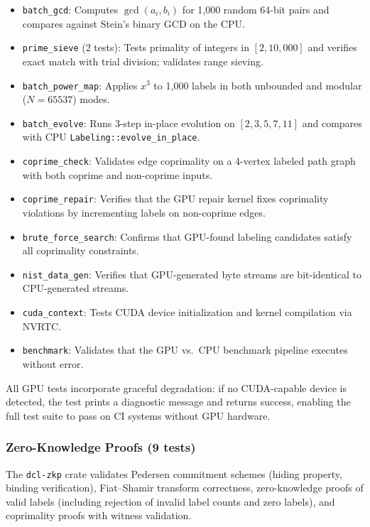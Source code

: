 \documentclass[lettersize,journal]{IEEEtran}
\begin{document}
\begin{itemize}
\item \texttt{batch\_gcd}: Computes $\gcd(a_i, b_i)$ for 1{,}000 random 64-bit pairs and compares against Stein's binary GCD on the CPU.
\item \texttt{prime\_sieve} (2 tests): Tests primality of integers in $[2, 10{,}000]$ and verifies exact match with trial division; validates range sieving.
\item \texttt{batch\_power\_map}: Applies $x^3$ to 1{,}000 labels in both unbounded and modular ($N = 65537$) modes.
\item \texttt{batch\_evolve}: Runs 3-step in-place evolution on $[2, 3, 5, 7, 11]$ and compares with CPU \texttt{Labeling::evolve\_in\_place}.
\item \texttt{coprime\_check}: Validates edge coprimality on a 4-vertex labeled path graph with both coprime and non-coprime inputs.
\item \texttt{coprime\_repair}: Verifies that the GPU repair kernel fixes coprimality violations by incrementing labels on non-coprime edges.
\item \texttt{brute\_force\_search}: Confirms that GPU-found labeling candidates satisfy all coprimality constraints.
\item \texttt{nist\_data\_gen}: Verifies that GPU-generated byte streams are bit-identical to CPU-generated streams.
\item \texttt{cuda\_context}: Tests CUDA device initialization and kernel compilation via NVRTC.
\item \texttt{benchmark}: Validates that the GPU vs.\ CPU benchmark pipeline executes without error.
\end{itemize}

\noindent All GPU tests incorporate graceful degradation: if no CUDA-capable device is detected, the test prints a diagnostic message and returns success, enabling the full test suite to pass on CI systems without GPU hardware.

\subsubsection{Zero-Knowledge Proofs (9 tests)}
The \texttt{dcl-zkp} crate validates Pedersen commitment schemes (hiding property, binding verification), Fiat--Shamir transform correctness, zero-knowledge proofs of valid labels (including rejection of invalid label counts and zero labels), and coprimality proofs with witness validation.
\end{document}
